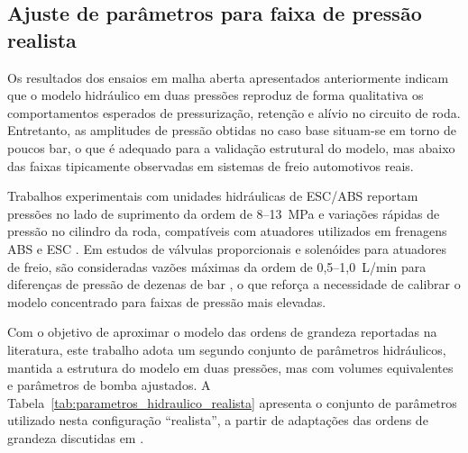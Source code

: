 \subsection{Ajuste de parâmetros para faixa de pressão realista}
\label{sec:controle-ajuste-parametros-realistas}

Os resultados dos ensaios em malha aberta apresentados anteriormente indicam que o modelo hidráulico em duas pressões reproduz de forma qualitativa os comportamentos esperados de pressurização, retenção e alívio no circuito de roda. Entretanto, as amplitudes de pressão obtidas no caso base situam-se em torno de poucos bar, o que é adequado para a validação estrutural do modelo, mas abaixo das faixas tipicamente observadas em sistemas de freio automotivos reais.

Trabalhos experimentais com unidades hidráulicas de ESC/ABS reportam pressões no lado de suprimento da ordem de 8–13~MPa e variações rápidas de pressão no cilindro da roda, compatíveis com atuadores utilizados em frenagens ABS e ESC \cite{ZengYangHuang2023,DesignESCUnitTestSystem2018,HouhuaJing2022}. Em estudos de válvulas proporcionais e solenóides para atuadores de freio, são consideradas vazões máximas da ordem de 0,5–1{,}0~L/min para diferenças de pressão de dezenas de bar \cite{ProportionalPressureABS2023,ChenLv2017}, o que reforça a necessidade de calibrar o modelo concentrado para faixas de pressão mais elevadas.

Com o objetivo de aproximar o modelo das ordens de grandeza reportadas na literatura, este trabalho adota um segundo conjunto de parâmetros hidráulicos, mantida a estrutura do modelo em duas pressões, mas com volumes equivalentes e parâmetros de bomba ajustados. A Tabela~\ref{tab:parametros_hidraulico_realista} apresenta o conjunto de parâmetros utilizado nesta configuração ``realista'', a partir de adaptações das ordens de grandeza discutidas em .

